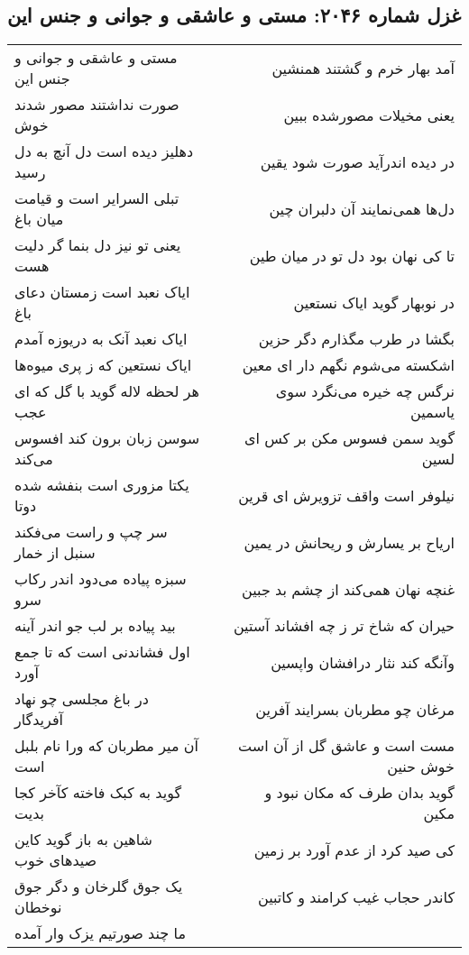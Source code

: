 \begin{center}
\section*{غزل شماره ۲۰۴۶: مستی و عاشقی و جوانی و جنس این}
\label{sec:2046}
\begin{longtable}{l p{0.5cm} r}
مستی و عاشقی و جوانی و جنس این
&&
آمد بهار خرم و گشتند همنشین
\\
صورت نداشتند مصور شدند خوش
&&
یعنی مخیلات مصورشده ببین
\\
دهلیز دیده است دل آنچ به دل رسید
&&
در دیده اندرآید صورت شود یقین
\\
تبلی السرایر است و قیامت میان باغ
&&
دل‌ها همی‌نمایند آن دلبران چین
\\
یعنی تو نیز دل بنما گر دلیت هست
&&
تا کی نهان بود دل تو در میان طین
\\
ایاک نعبد است زمستان دعای باغ
&&
در نوبهار گوید ایاک نستعین
\\
ایاک نعبد آنک به دریوزه آمدم
&&
بگشا در طرب مگذارم دگر حزین
\\
ایاک نستعین که ز پری میوه‌ها
&&
اشکسته می‌شوم نگهم دار ای معین
\\
هر لحظه لاله گوید با گل که ای عجب
&&
نرگس چه خیره می‌نگرد سوی یاسمین
\\
سوسن زبان برون کند افسوس می‌کند
&&
گوید سمن فسوس مکن بر کس ای لسین
\\
یکتا مزوری است بنفشه شده دوتا
&&
نیلوفر است واقف تزویرش ای قرین
\\
سر چپ و راست می‌فکند سنبل از خمار
&&
اریاح بر یسارش و ریحانش در یمین
\\
سبزه پیاده می‌دود اندر رکاب سرو
&&
غنچه نهان همی‌کند از چشم بد جبین
\\
بید پیاده بر لب جو اندر آینه
&&
حیران که شاخ تر ز چه افشاند آستین
\\
اول فشاندنی است که تا جمع آورد
&&
وآنگه کند نثار درافشان واپسین
\\
در باغ مجلسی چو نهاد آفریدگار
&&
مرغان چو مطربان بسرایند آفرین
\\
آن میر مطربان که ورا نام بلبل است
&&
مست است و عاشق گل از آن است خوش حنین
\\
گوید به کبک فاخته کآخر کجا بدیت
&&
گوید بدان طرف که مکان نبود و مکین
\\
شاهین به باز گوید کاین صیدهای خوب
&&
کی صید کرد از عدم آورد بر زمین
\\
یک جوق گلرخان و دگر جوق نوخطان
&&
کاندر حجاب غیب کرامند و کاتبین
\\
ما چند صورتیم یزک وار آمده

\end{longtable}
\end{center}
